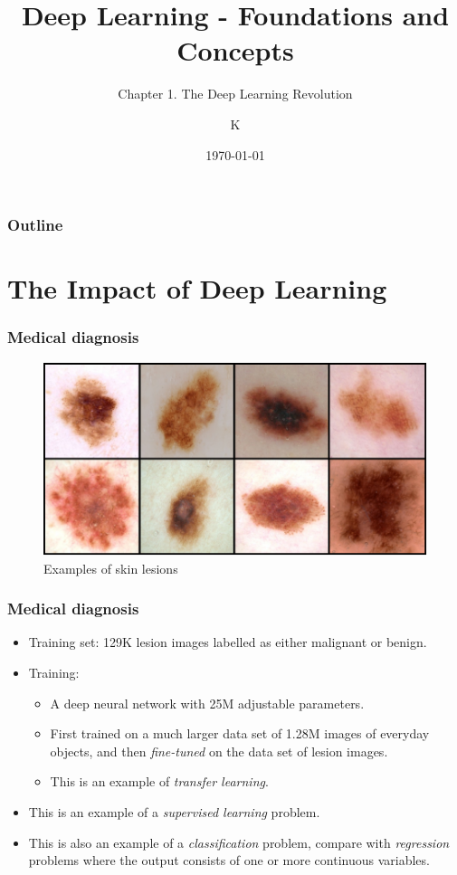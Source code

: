 \documentclass{beamer}
\title{Deep Learning - Foundations and Concepts}
\subtitle{Chapter 1. The Deep Learning Revolution}
\author{K}
\date{\today}
\begin{document}
\begin{frame}
    \titlepage
\end{frame}

\begin{frame}
    \frametitle{Outline}
    \tableofcontents
\end{frame}

\section{The Impact of Deep Learning}

\begin{frame}
    \frametitle{Medical diagnosis}
    \begin{figure}
        \caption{Examples of skin lesions}
        \includegraphics{Figure_1.pdf}
    \end{figure}
\end{frame}

\begin{frame}
    \frametitle{Medical diagnosis}
    \begin{itemize}
        \item Training set: 129K lesion images labelled as either malignant or benign.
        \item Training:
        \begin{itemize}
            \item A deep neural network with 25M adjustable parameters.
            \item First trained on a much larger data set of 1.28M images of everyday objects, and then \emph{fine-tuned} on the data set of lesion images.
            \item This is an example of \emph{transfer learning}.
        \end{itemize}
        \item This is an example of a \emph{supervised learning} problem.
        \item This is also an example of a \emph{classification} problem, compare with \emph{regression} problems where the output consists of one or more continuous variables.
    \end{itemize}
\end{frame}
\end{document}
